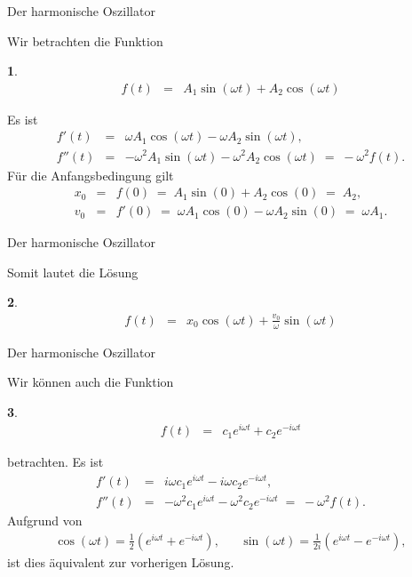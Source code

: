 \documentclass[german]{beamer}
\newcommand{\bq}{\begin{eqnarray*}}
\newcommand{\eq}{\end{eqnarray*}}
\newtheorem*{myemptytheorem}{}
\begin{document}
\begin{frame}{Der harmonische Oszillator}

Wir betrachten die Funktion
\begin{myemptytheorem}
\bq
 f\left(t\right) & = & A_1 \sin\left(\omega t\right) + A_2 \cos\left(\omega t\right)
\eq
\end{myemptytheorem}
Es ist
\bq
 f'\left(t\right) & = & \omega A_1 \cos\left(\omega t\right) - \omega A_2 \sin\left(\omega t\right),
 \nonumber \\
 f''\left(t\right) & = & - \omega^2 A_1 \sin\left(\omega t\right) - \omega^2 A_2 \cos\left(\omega t\right)
 \; = \; 
 - \omega^2 f(t).
\eq
F\"ur die Anfangsbedingung gilt
\bq
 x_0 & = & f\left(0\right) \; = \; A_1 \sin\left(0\right) + A_2 \cos\left(0\right) \; = \; A_2,
 \nonumber \\
 v_0 & = &  f'\left(0\right) \; = \; \omega A_1 \cos\left(0\right) - \omega A_2 \sin\left(0\right)
 \; = \; \omega A_1.
\eq

\end{frame}

\begin{frame}{Der harmonische Oszillator}

Somit lautet die L\"osung
\begin{myemptytheorem}
\bq
 f\left(t\right) & = & x_0 \cos\left(\omega t\right) +\frac{v_0}{\omega} \sin\left(\omega t\right) 
\eq
\end{myemptytheorem}

\end{frame}

\begin{frame}{Der harmonische Oszillator}

Wir k\"onnen auch die Funktion
\begin{myemptytheorem}
\bq
 f\left(t\right) & = & c_1 e^{i\omega t} + c_2 e^{-i \omega t}
\eq
\end{myemptytheorem}
betrachten.
Es ist
\bq
 f'\left(t\right) & = & i \omega c_1 e^{i\omega t} - i \omega c_2 e^{-i \omega t},
 \nonumber \\
 f''\left(t\right) & = & - \omega^2 c_1 e^{i\omega t} - \omega^2 c_2 e^{-i \omega t}
 \; = \; 
 - \omega^2 f(t).
\eq
Aufgrund von
\bq
 \cos\left(\omega t\right) = \frac{1}{2} \left( e^{i\omega t} + e^{-i\omega t} \right),
 & &
 \sin\left(\omega t\right) = \frac{1}{2i} \left( e^{i\omega t} - e^{-i\omega t} \right),
\eq
ist dies \"aquivalent zur vorherigen L\"osung.

\end{frame}
\end{document}

